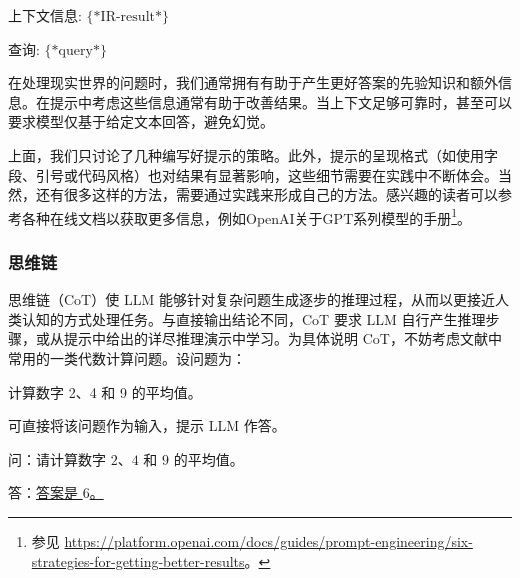 \begin{itemize}
\begin{tcolorbox}
    \vspace{0.5em}

    上下文信息: $\{*\mathrm{IR\textrm{-}result}*\}$

    \vspace{0.3em}

    查询: $\{*\mathrm{query}*\}$

    \vspace{0.3em}

    \underline{\hspace{2em}}

    \endgroup

    \end{tcolorbox}
    \vspace{0.5em}

    在处理现实世界的问题时，我们通常拥有有助于产生更好答案的先验知识和额外信息。在提示中考虑这些信息通常有助于改善结果。当上下文足够可靠时，甚至可以要求模型仅基于给定文本回答，避免幻觉。

\end{itemize}
\vspace{0.5em}

上面，我们只讨论了几种编写好提示的策略。此外，提示的呈现格式（如使用字段、引号或代码风格）也对结果有显著影响，这些细节需要在实践中不断体会。当然，还有很多这样的方法，需要通过实践来形成自己的方法。感兴趣的读者可以参考各种在线文档以获取更多信息，例如OpenAI关于GPT系列模型的手册\footnote{参见 \url{https://platform.openai.com/docs/guides/prompt-engineering/six-strategies-for-getting-better-results}。}。
\subsubsection{思维链}
\label{sec:chain-of-thought}

\noindent 思维链（CoT）使 LLM 能够针对复杂问题生成逐步的推理过程，从而以更接近人类认知的方式处理任务。与直接输出结论不同，CoT 要求 LLM 自行产生推理步骤，或从提示中给出的详尽推理演示中学习。为具体说明 CoT，不妨考虑文献中常用的一类代数计算问题。设问题为：

\vspace{0.8em}

\hspace{5em} 计算数字 2、4 和 9 的平均值。

\vspace{0.8em}

\noindent 可直接将该问题作为输入，提示 LLM 作答。

\vspace{0.5em}
\begin{tcolorbox}
\begingroup
\setlength{\leftskip}{2em}
\setlength{\rightskip}{2em}

问：请计算数字 $2$、$4$ 和 $9$ 的平均值。

\vspace{0.3em}

答：\underline{答案是 $6$。}

\endgroup
\end{tcolorbox}
\vspace{0.5em}

